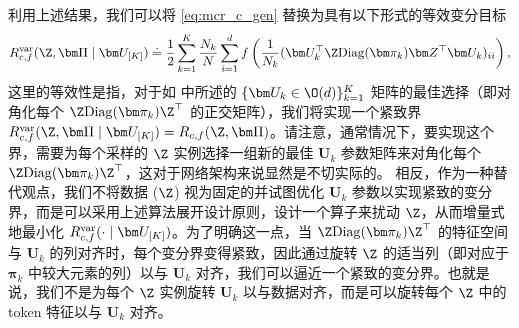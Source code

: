 \documentclass[../../book-main_zh.tex]{subfiles}
\begin{document}
利用上述结果，我们可以将 \eqref{eq:mcr_c_gen} 替换为具有以下形式的等效变分目标
\vspace{-2mm}
\begin{equation}
    \label{eq:var_comp}
    R^{\rm var}_{c,f} (\Z,\bm \Pi \mid \bm U_{[K]}) \doteq
    \frac{1}{2}\sum_{k=1}^K \frac{N_k}{N} \sum_{i=1}^{d}
    f\left(\frac{1}{N_k} (\bm U_{k}^{\top} \Z \mathrm{Diag}(\bm
    \pi_k) \bm Z^{\top} \bm U_{k})_{ii} \right),
\end{equation}
这里的等效性是指，对于如  中所述的 $\{ \bm U_k \in \O(d)\}_{k=1}^K$ 矩阵的最佳选择（即对角化每个 $\Z \mathrm{Diag}(\bm \pi_k) \Z^\top $ 的正交矩阵），我们将实现一个紧致界 $ R^{\rm var}_{c,f} (\Z,\bm \Pi \mid \bm U_{[K]}) =
R_{c,f} (\Z,\bm \Pi)$。请注意，通常情况下，要实现这个界，需要为每个采样的 $\Z$ 实例选择一组新的最佳 $\bm U_{k}$ 参数矩阵来对角化每个 $\Z\mathrm{Diag}(\bm \pi_{k})\Z^{\top}$，这对于网络架构来说显然是不切实际的。
相反，作为一种替代观点，我们不将数据 ($\Z$) 视为固定的并试图优化 $\bm U_k$ 参数以实现紧致的变分界，而是可以采用上述算法展开设计原则，设计一个算子来扰动 $\Z$，从而增量式地最小化 $R_{c, f}^{\rm
var}(\cdot \mid \bm U_{[K]})$。为了明确这一点，当 $\Z
\mathrm{Diag}(\bm \pi_k) \Z
^\top$ 的特征空间与 $\bm U_k$ 的列对齐时，每个变分界变得紧致，因此通过旋转 $\Z$ 的适当列（即对应于 $\bm \pi_k$ 中较大元素的列）以与 $\bm U_k$ 对齐，我们可以逼近一个紧致的变分界。也就是说，我们不是为每个 $\Z$ 实例旋转 $\bm U_k$ 以与数据对齐，而是可以旋转每个 $\Z$ 中的 token 特征以与 $\bm U_k$ 对齐。
\end{document}
